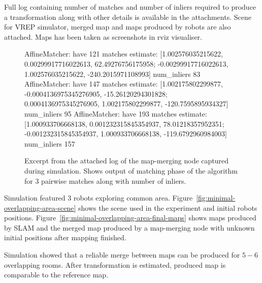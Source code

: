 Full log containing number of matches and number of inliers required to produce a transformation along with other details is available in the attachments. Scene for \gls{VREP} simulator, merged map and maps produced by robots are also attached. Maps has been taken as screenshots in rviz visualiser.

\begin{figure}
    \centering
	\begin{code}
AffineMatcher: have 121 matches
estimate:
[1.002576035215622, 0.00299917716022613, 62.49276756175958;
 -0.00299917716022613, 1.002576035215622, -240.2015971108993]
num_inliers 83
AffineMatcher: have 147 matches
estimate:
[1.002175802299877, -0.0004136975345276905, -15.26120294301828;
 0.0004136975345276905, 1.002175802299877, -120.7595895934327]
num_inliers 95
AffineMatcher: have 193 matches
estimate:
[1.000933706668138, 0.001232315845354937, 78.01218357952351;
 -0.001232315845354937, 1.000933706668138, -119.6792960984003]
num_inliers 157
	\end{code}
    \caption[Excerpt from the attached log of the map-merging node.]{Excerpt from the attached log of the map-merging node captured during simulation. Shows output of matching phase of the algorithm for $3$ pairwise matches along with number of inliers.}
    \label{fig:minimal-overlapping-area-log}
\end{figure}


Simulation featured $3$ robots exploring common area. Figure~\ref{fig:minimal-overlapping-area-scene} shows the scene used in the experiment and initial robots positions. Figure~\ref{fig:minimal-overlapping-area-final-maps} shows maps produced by \gls{SLAM} and the merged map produced by a map-merging node with unknown initial positions after mapping finished.

Simulation showed that a reliable merge between maps can be produced for $5-6$ overlapping rooms. After transformation is estimated, produced map is comparable to the reference map.

